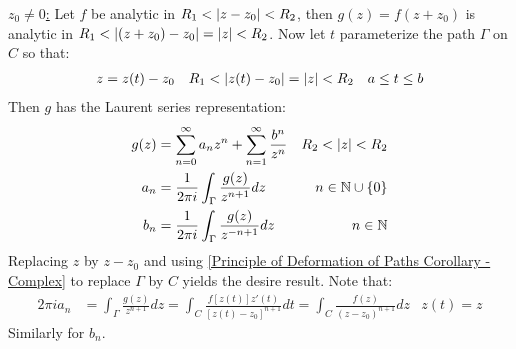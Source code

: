 \documentclass[12pt, english]{book}
\makeatletter
\renewenvironment{proof}[1][\proofname]{\par
	\pushQED{\qed}%
	\normalfont \topsep6\p@\@plus6\p@\relax
	\list{}{%
		\settowidth{\leftmargin}{\itshape\proofname:\hskip\labelsep}%
		\setlength{\labelwidth}{0pt}%
		\setlength{\itemindent}{-\leftmargin}%
	}%
	\item[\hskip\labelsep\itshape#1\@addpunct{:}]\ignorespaces
}{%
	\popQED\endlist\@endpefalse
}
\makeatother
\begin{document}
\begin{proof}
		\underline{\(z_0 \neq 0\):} \newline
		Let \(f\) be analytic in \(R_1 < \abs{z-z_0} < R_2\), then \(g(z) = f(z + z_0)\) is analytic in \(R_1 < \abs{(z+z_0) - z_0} = \abs{z} < R_2\). Now let \(t\) parameterize the path \(\Gamma\) on \(C\) so that:
		\begin{align*}
			z &= z(t) - z_0 & R_1 &< \abs{z(t) - z_0} = \abs{z} < R_2 & a \leq t \leq b
		\end{align*}
		Then \(g\) has the Laurent series representation:
		\begin{align*}
			g(z) &= \sum_{n=0}^{\infty} a_n z^n + \sum_{n=1}^{\infty} \frac{b^n}{z^n} &
				R_2 < \abs{z} < R_2 \\
			a_n &= \frac{1}{2\pi i} \int_\Gamma \frac{g(z)}{z^{n+1}} dz & n \in \mathbb{N} \cup \{0\} \\
			b_n &= \frac{1}{2\pi i} \int_\Gamma \frac{g(z)}{z^{-n+1}} dz & n \in \mathbb{N}
		\end{align*}
		Replacing \(z\) by \(z - z_0\) and using \cref{Principle of Deformation of Paths Corollary - Complex} to replace \(\Gamma\) by \(C\) yields the desire result. Note that: 
		\begin{align*}
			2\pi i a_n 
			&= \int_\Gamma \frac{g(z)}{z^{n+1}} dz 
			 = \int_{C} \frac{f[z(t)]z'(t)}{[z(t) - z_0]^{n+1}} dt = \int_{C} \frac{f(z)}{(z-z_0)^{n+1}} dz & z(t) = z
		\end{align*}
		Similarly for \(b_n\).
	\end{proof}
\end{document}
